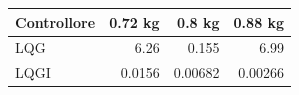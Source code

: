 \begin{tabular}{lrrr}\toprule
Controllore & 0.72 kg & 0.8 kg & 0.88 kg\\\midrule
LQG & \num{6.26} & \num{0.155} & \num{6.99}\\
LQGI & \num{0.0156} & \num{0.00682} & \num{0.00266}\\
\bottomrule\end{tabular}
